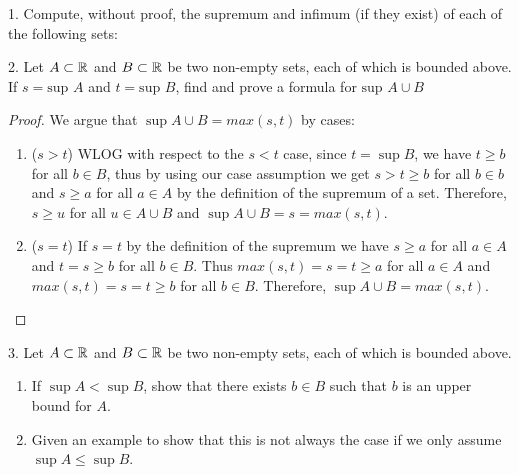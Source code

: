 

1. Compute, without proof, the supremum and infimum (if they exist) of each of the following sets:

2. Let $A \subset \mathbb{R}$ and $B \subset \mathbb{R}$ be two non-empty sets, each of which is bounded above. If $s=\text{sup }A $ and $t=\text{sup }B $, find and prove a formula for $\text{sup } A \cup B$

\begin{proof}
	We argue that $\sup A \cup B = max\left( s, t \right) $ by cases:
	\begin{enumerate}
		\item ($s>t$) WLOG with respect to the $s < t$ case, since $t=\sup B$, we have  $t \ge b$ for all $b \in B$, thus by using our case assumption we get $s > t \ge b$ for all $b \in b$ and $s \ge  a$ for all $a \in A$ by the definition of the supremum of a set. Therefore, $s \ge u$ for all $u \in A \cup B$ and $\sup A \cup B = s = max\left( s, t \right) $.
		\item ($s = t$) If $s=t$ by the definition of the supremum we have $s \ge a$ for all $a \in A$ and $t = s \ge b$ for all $b \in B$. Thus  $max\left( s, t \right) = s = t \ge a$ for all $a \in A$ and $max\left( s, t \right) = s = t \ge b$ for all $b \in B$. Therefore, $\sup A \cup B = max\left( s, t \right) $.
	\end{enumerate}
\end{proof}

3. Let $A \subset \mathbb{R}$ and $B \subset \mathbb{R}$ be two non-empty sets, each of which is bounded above. 
\begin{enumerate}
	\item If $\sup A < \sup B$, show that there exists $b \in B$ such that $b$ is an upper bound for $A$.
	\item Given an example to show that this is not always the case if we only assume $\sup A \le \sup B$.
\end{enumerate}

